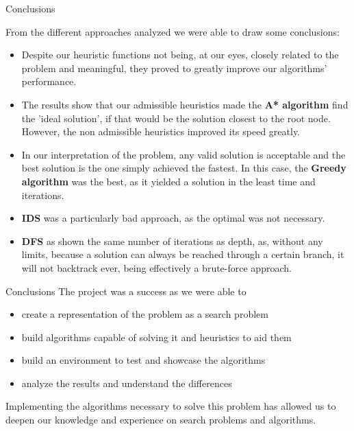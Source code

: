 \begin{frame}{Conclusions}
    
    From the different approaches analyzed we were able to draw some conclusions:
    \begin{itemize}
        \item Despite our heuristic functions not being, at our eyes, closely related to the problem and meaningful, they proved to greatly improve our algorithms' performance.
        \item The results show that our admissible heuristics made the \textbf{A* algorithm} find the 'ideal solution', if that would be the solution closest to the root node. However, the non admissible heuristics improved its speed greatly.
        \item In our interpretation of the problem, any valid solution is acceptable and the best solution is the one simply achieved the fastest. In this case, the \textbf{Greedy algorithm} was the best, as it yielded a solution in the least time and iterations.
        \item \textbf{IDS} was a particularly bad approach, as the optimal was not necessary.
        \item \textbf{DFS} as shown the same number of iterations as depth, as, without any limits, because a solution can always be reached through a certain branch, it will not backtrack ever, being effectively a brute-force approach.
    \end{itemize}

\end{frame}

\begin{frame}{Conclusions}
    The project was a success as we were able to
    \begin{itemize}
        \item create a representation of the problem as a search problem
        \item build algorithms capable of solving it and heuristics to aid them
        \item build an environment to test and showcase the algorithms 
        \item analyze the results and understand the differences 
    \end{itemize}
    Implementing the algorithms necessary to solve this problem  has allowed us to deepen our knowledge and experience on search problems and algorithms.
    
\end{frame}